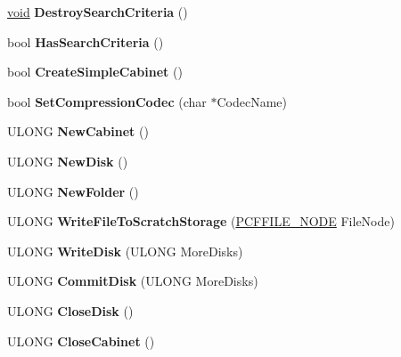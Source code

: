 \begin{DoxyCompactItemize}
\hyperlink{interfacevoid}{void} {\bfseries Destroy\+Search\+Criteria} ()
\item 
\mbox{\label{class_c_cabinet_a53f93d0d59dfc454a9783ef351fe2aaa}} 
bool {\bfseries Has\+Search\+Criteria} ()
\item 
\mbox{\label{class_c_cabinet_af635060c31c7c8b724116736bc1b3da4}} 
bool {\bfseries Create\+Simple\+Cabinet} ()
\item 
\mbox{\label{class_c_cabinet_aa8e9b494423250aedf8f0cd0d1bfaaf8}} 
bool {\bfseries Set\+Compression\+Codec} (char $\ast$Codec\+Name)
\item 
\mbox{\label{class_c_cabinet_a17383cbb27d6866cf0e01de3ceaac196}} 
U\+L\+O\+NG {\bfseries New\+Cabinet} ()
\item 
\mbox{\label{class_c_cabinet_abde44c8946bfd28517f9416925dff7a9}} 
U\+L\+O\+NG {\bfseries New\+Disk} ()
\item 
\mbox{\label{class_c_cabinet_a4c4ab9c77009d0484be57bcb487d88b9}} 
U\+L\+O\+NG {\bfseries New\+Folder} ()
\item 
\mbox{\label{class_c_cabinet_ae38bfeabd9ea5a6eeb064d2ece4cea5c}} 
U\+L\+O\+NG {\bfseries Write\+File\+To\+Scratch\+Storage} (\hyperlink{struct___c_f_f_i_l_e___n_o_d_e}{P\+C\+F\+F\+I\+L\+E\+\_\+\+N\+O\+DE} File\+Node)
\item 
\mbox{\label{class_c_cabinet_ae0d972fe60021649ab0e6756250b9988}} 
U\+L\+O\+NG {\bfseries Write\+Disk} (U\+L\+O\+NG More\+Disks)
\item 
\mbox{\label{class_c_cabinet_ad3ae7e15d6c02ee2b7ae1005cf73a049}} 
U\+L\+O\+NG {\bfseries Commit\+Disk} (U\+L\+O\+NG More\+Disks)
\item 
\mbox{\label{class_c_cabinet_a88f16c6f1eff8efec048fcdf1504e249}} 
U\+L\+O\+NG {\bfseries Close\+Disk} ()
\item 
\mbox{\label{class_c_cabinet_a957e3743f8cce437f08f4dba89fbf49c}} 
U\+L\+O\+NG {\bfseries Close\+Cabinet} ()

\end{DoxyCompactItemize}
